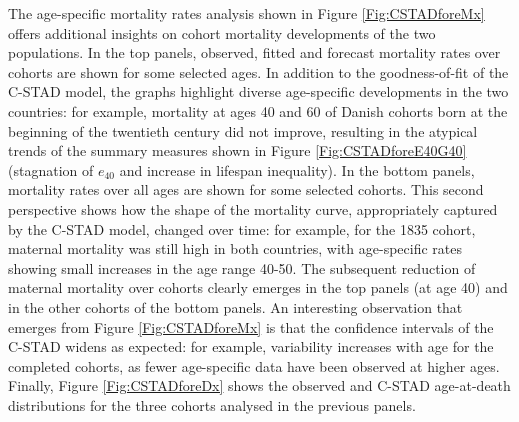 \documentclass[11pt, a4paper]{article}
\begin{document}
The age-specific mortality rates analysis shown in Figure \ref{Fig:CSTADforeMx} offers additional insights on cohort mortality developments of the two populations. In the top panels, observed, fitted and forecast mortality rates over cohorts are shown for some selected ages. In addition to the goodness-of-fit of the C-STAD model, the graphs highlight diverse age-specific developments in the two countries: for example, mortality at ages 40 and 60 of Danish cohorts born at the beginning of the twentieth century did not improve, resulting in the atypical trends of the summary measures shown in Figure \ref{Fig:CSTADforeE40G40} (stagnation of $e_{40}$ and increase in lifespan inequality). In the bottom panels, mortality rates over all ages are shown for some selected cohorts. This second perspective shows how the shape of the mortality curve, appropriately captured by the C-STAD model, changed over time: for example, for the 1835 cohort, maternal mortality was still high in both countries, with age-specific rates showing small increases in the age range 40-50. The subsequent reduction of maternal mortality over cohorts clearly emerges in the top panels (at age 40) and in the other cohorts of the bottom panels. An interesting observation that emerges from Figure \ref{Fig:CSTADforeMx} is that the confidence intervals of the C-STAD widens as expected: for example, variability increases with age for the completed cohorts, as fewer age-specific data have been observed at higher ages. Finally, Figure \ref{Fig:CSTADforeDx} shows the observed and C-STAD age-at-death distributions for the three cohorts analysed in the previous panels. 
\end{document}
